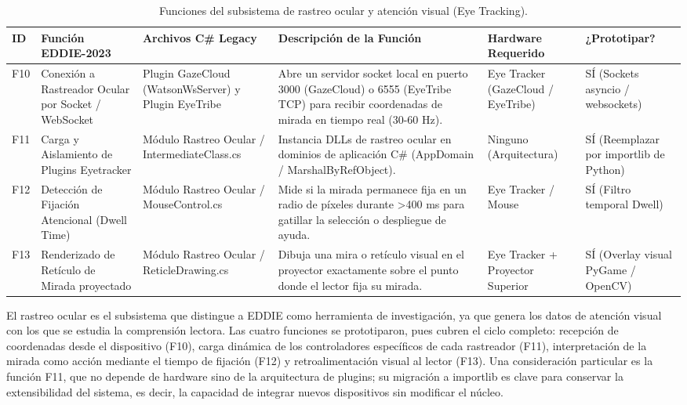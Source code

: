 \begin{table}[H]
    \centering
    \caption{Funciones del subsistema de rastreo ocular y atención visual (Eye Tracking).}
    \label{tab:func_rastreo_ocular}
    \begin{small}
    \begin{tabular}{L{0.6cm} L{2.2cm} L{2.2cm} L{4.1cm} L{1.6cm} L{1.8cm}}
        \toprule
        ID & Función EDDIE-2023 & Archivos C\# Legacy & Descripción de la Función & Hardware Requerido & ¿Prototipar? \\ \midrule
        F10 & Conexión a Rastreador Ocular por Socket / WebSocket & Plugin GazeCloud (WatsonWsServer) y Plugin EyeTribe & Abre un servidor socket local en puerto 3000 (GazeCloud) o 6555 (EyeTribe TCP) para recibir coordenadas de mirada en tiempo real (30-60 Hz). & Eye Tracker (GazeCloud / EyeTribe) & SÍ (Sockets  asyncio / websockets) \\ \midrule
        F11 & Carga y Aislamiento de Plugins Eyetracker & Módulo Rastreo Ocular / IntermediateClass.cs & Instancia DLLs de rastreo ocular en dominios de aplicación C\# (AppDomain / MarshalByRefObject). & Ninguno (Arquitectura) & SÍ (Reemplazar por importlib de Python) \\ \midrule
        F12 & Detección de Fijación Atencional (Dwell Time) & Módulo Rastreo Ocular / MouseControl.cs & Mide si la mirada permanece fija en un radio de píxeles durante >400 ms para gatillar la selección o despliegue de ayuda. & Eye Tracker / Mouse & SÍ (Filtro temporal Dwell) \\ \midrule
        F13 & Renderizado de Retículo de Mirada proyectado & Módulo Rastreo Ocular / ReticleDrawing.cs & Dibuja una mira o retículo visual en el proyector exactamente sobre el punto donde el lector fija su mirada. & Eye Tracker + Proyector Superior & SÍ (Overlay visual PyGame / OpenCV) \\ \bottomrule
    \end{tabular}
    \end{small}
\end{table}
 
El rastreo ocular es el subsistema que distingue a EDDIE como herramienta de investigación, ya que genera los datos de atención visual con los que se estudia la comprensión lectora. Las cuatro funciones se prototiparon, pues cubren el ciclo completo: recepción de coordenadas desde el dispositivo (F10), carga dinámica de los controladores específicos de cada rastreador (F11), interpretación de la mirada como acción mediante el tiempo de fijación (F12) y retroalimentación visual al lector (F13). Una consideración particular es la función F11, que no depende de hardware sino de la arquitectura de plugins; su migración a importlib es clave para conservar la extensibilidad del sistema, es decir, la capacidad de integrar nuevos dispositivos sin modificar el núcleo.
 
